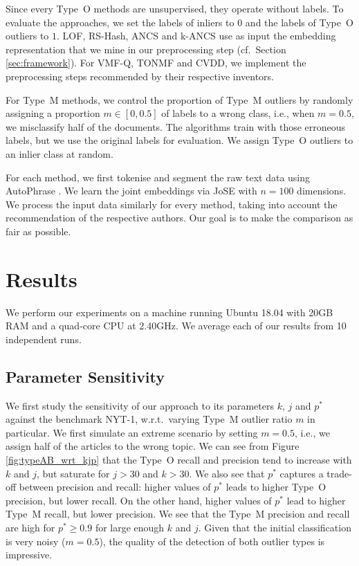 Since every Type~O methods are unsupervised, they operate without labels. To evaluate the approaches, we set the labels of inliers to $0$ and the labels of Type~O outliers to $1$. 
\gls{LOF}, \gls{RS-Hash}, \gls{ANCS} and \gls{k-ANCS} use as input the embedding representation that we mine in our preprocessing step (cf.\ Section \ref{sec:framework}). For \gls{VMF-Q}, \gls{TONMF} and \gls{CVDD}, we implement the preprocessing steps recommended by their respective inventors. 

For Type~M methods, we control the proportion of Type~M outliers %
by randomly assigning a proportion $m \in [0, 0.5]$ of labels to a wrong class, i.e., when $m = 0.5$, we misclassify half of the documents. The algorithms train with those erroneous labels, but we use the original labels for evaluation. We assign Type~O outliers to an inlier class at random. 

For each method, %
we first tokenise and segment the raw text data using AutoPhrase \cite{DBLP:journals/tkde/ShangLJRVH18}. We learn the joint embeddings via \gls{JoSE} \cite{meng2019spherical} with $n=100$ dimensions. 
We process the input data similarly for every method, taking into account the recommendation of the respective authors. Our goal is to make the comparison as fair as possible. 

\section{Results}
\label{results}

We perform our experiments on a machine running Ubuntu 18.04 with 20GB RAM and a quad-core CPU at 2.40GHz. We average each of our results from 10 independent runs. 

\subsection{Parameter Sensitivity}
\label{sec:sensitivity}

We first study the sensitivity of our approach to its parameters $k$, $j$ and $p^*$ against the benchmark NYT-1, w.r.t.\ varying Type~M outlier ratio $m$ in particular.  
We first simulate an extreme scenario by setting $m= 0.5$, i.e., we assign half of the articles to the wrong topic. 
We can see from Figure \ref{fig:typeAB_wrt_kjp} that the Type~O recall and precision tend to increase with $k$ and $j$, but saturate for $j > 30$ and $k > 30$. 
We also see that $p^*$ captures a trade-off between precision and recall: higher values of $p^*$ leads to higher Type~O precision, but lower recall.
On the other hand, higher values of $p^*$ lead to higher Type~M recall, but lower precision. 
We see that the Type~M precision and recall are high for $p^* \geq 0.9$ for large enough $k$ and $j$. 
Given that the initial classification is very noisy ($m = 0.5$), the quality of the detection of both outlier types is impressive. 

